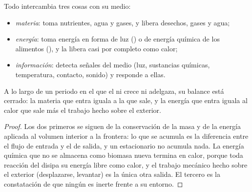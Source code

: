 \begin{proposition}\label{prop:b1:organism-environment:exchanges}
Todo  intercambia tres cosas con su medio:
\begin{itemize}
  \item \emph{materia}: toma nutrientes,
        agua y gases, y libera desechos, gases y agua;
  \item \emph{energía}: toma energía en forma
        de luz () o de energía química de los alimentos
        (), y la libera casi por completo como calor;
  \item \emph{información}: detecta
        señales del medio (luz, sustancias químicas, temperatura,
        contacto, sonido) y responde a ellas.
\end{itemize}
A lo largo de un periodo en el que el  ni crece ni adelgaza, su
balance está cerrado: la materia que entra iguala a la que sale, y la
energía que entra iguala al calor que sale más el trabajo hecho sobre el
exterior.
\end{proposition}
\begin{proof}
Los dos primeros se siguen de la conservación de la masa y de la energía
aplicada al volumen interior a la frontera: lo que se acumula es la
diferencia entre el flujo de entrada y el de salida, y un 
estacionario no acumula nada. La energía química que no se almacena como
biomasa nueva termina en calor, porque toda reacción del  disipa
su energía libre como calor, y el trabajo mecánico hecho sobre el exterior
(desplazarse, levantar) es la única otra salida. El tercero es la
constatación de que ningún  es inerte frente a su entorno.
\end{proof}

